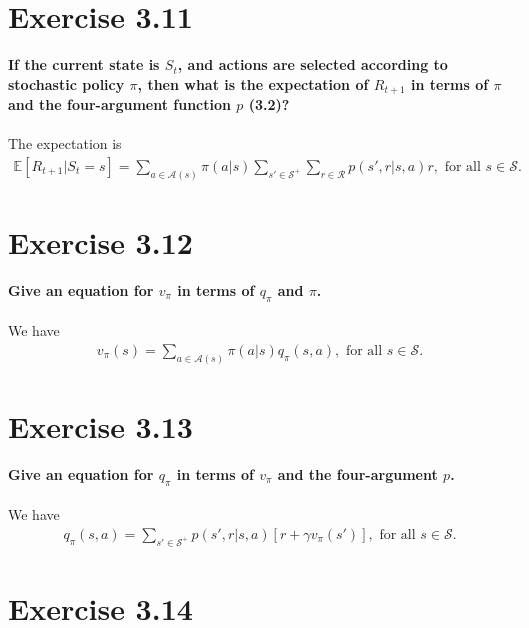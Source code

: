 \documentclass[a4paper,11pt]{article}
\numberwithin{equation}{section}
\theoremstyle{remark}
\newcommand{\E}{\mathbb E}
\begin{document}
\section{Exercise 3.11}

\textbf{If the current state is $S_t$, and actions are selected according to stochastic policy $\pi$, then what is the expectation of $R_{t+1}$ in terms of $\pi$ and the four-argument function $p$ (3.2)?}
\\ \\
The expectation is 
\begin{align*}
	\E[R_{t+1}|S_t = s] = \sum_{a \in \mathcal{A}(s)}^{} \pi(a|s) \sum_{s' \in \mathcal{S}^+}^{} \sum_{r \in \mathcal{R}}^{} p(s', r| s, a) 
	r, \text{ for all } s \in \mathcal{S}.
\end{align*}

\section{Exercise 3.12}

\textbf{Give an equation for $v_\pi$ in terms of $q_\pi$ and $\pi$.}
\\ \\
We have 
\begin{align*}
	v_\pi(s) = \sum_{a \in \mathcal{A}(s)}^{} \pi(a|s) q_\pi(s, a), \text{ for all } s \in \mathcal{S}.
\end{align*}

\section{Exercise 3.13}

\textbf{Give an equation for $q_\pi$ in terms of $v_\pi$ and the four-argument $p$.}
\\ \\
We have 
\begin{align*}
	q_\pi(s, a) = \sum_{s' \in \mathcal{S}^+}^{} p(s', r | s, a) [r + \gamma v_\pi(s')], \text{ for all } s \in \mathcal{S}.
\end{align*}

\section{Exercise 3.14}
\end{document}
